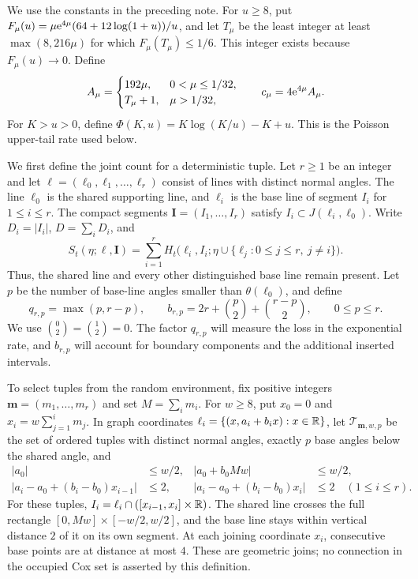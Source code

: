 \documentclass[11pt,letterpaper]{article}
\begin{document}
We use the constants in the preceding note. For $u\ge8$, put $F_\mu(u)=\mu\mathrm{e}^{4\mu}(64+12\log(1+u))/u$, and let $T_\mu$ be the least integer at least $\max(8,216\mu)$ for which $F_\mu(T_\mu)\le1/6$. This integer exists because $F_\mu(u)\to0$. Define
\[
 A_\mu=\begin{cases}192\mu,&0<\mu\le1/32,\\T_\mu+1,&\mu>1/32,\end{cases}
 \qquad c_\mu=4\mathrm{e}^{4\mu}A_\mu.
\]
For $K>u>0$, define $\Phi(K,u)=K\log(K/u)-K+u$. This is the Poisson upper-tail rate used below.

We first define the joint count for a deterministic tuple. Let $r\ge1$ be an integer and let $\boldsymbol\ell=(\ell_0,\ell_1,\ldots,\ell_r)$ consist of lines with distinct normal angles. The line $\ell_0$ is the shared supporting line, and $\ell_i$ is the base line of segment $I_i$ for $1\le i\le r$. The compact segments $\boldsymbol I=(I_1,\ldots,I_r)$ satisfy $I_i\subset J(\ell_i,\ell_0)$. Write $D_i=|I_i|$, $D=\sum_iD_i$, and
\begin{equation}\label{eq:joint-count}
 S_t(\eta;\boldsymbol\ell,\boldsymbol I)
 =\sum_{i=1}^r H_t\big(\ell_i,I_i;
                 \eta\cup\{\ell_j:0\le j\le r,\ j\ne i\}\big).
\end{equation}
Thus, the shared line and every other distinguished base line remain present. Let $p$ be the number of base-line angles smaller than $\theta(\ell_0)$, and define
\[
 q_{r,p}=\max(p,r-p),\qquad
 b_{r,p}=2r+\binom p2+\binom{r-p}2,
 \qquad 0\le p\le r.
\]
We use $\binom02=\binom12=0$. The factor $q_{r,p}$ will measure the loss in the exponential rate, and $b_{r,p}$ will account for boundary components and the additional inserted intervals.

To select tuples from the random environment, fix positive integers $\boldsymbol m=(m_1,\ldots,m_r)$ and set $M=\sum_i m_i$. For $w\ge8$, put $x_0=0$ and $x_i=w\sum_{j=1}^i m_j$. In graph coordinates $\ell_i=\{(x,a_i+b_ix):x\in\mathbb R\}$, let $\mathcal T_{\boldsymbol m,w,p}$ be the set of ordered tuples with distinct normal angles, exactly $p$ base angles below the shared angle, and
\begin{equation}\label{eq:geometry}
\begin{aligned}
 |a_0|&\le w/2, & |a_0+b_0Mw|&\le w/2,\\
 |a_i-a_0+(b_i-b_0)x_{i-1}|&\le2,
 &|a_i-a_0+(b_i-b_0)x_i|&\le2\quad(1\le i\le r).
\end{aligned}
\end{equation}
For these tuples, $I_i=\ell_i\cap([x_{i-1},x_i]\times\mathbb R)$. The shared line crosses the full rectangle $[0,Mw]\times[-w/2,w/2]$, and the base line stays within vertical distance $2$ of it on its own segment. At each joining coordinate $x_i$, consecutive base points are at distance at most $4$. These are geometric joins; no connection in the occupied Cox set is asserted by this definition.
\end{document}
